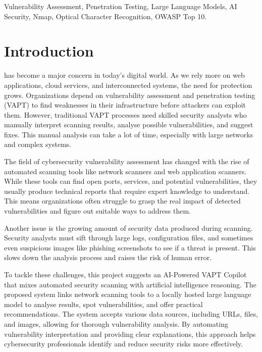 \documentclass[journal]{IEEEtran}
\begin{document}
\begin{IEEEkeywords}
Vulnerability Assessment, Penetration Testing, Large Language Models, AI Security, Nmap, Optical Character Recognition, OWASP Top 10.
\end{IEEEkeywords}


\section{Introduction}
 has become a major concern in today's digital world. As we rely more on web applications, cloud services, and interconnected systems, the need for protection grows. Organizations depend on vulnerability assessment and penetration testing (VAPT) to find weaknesses in their infrastructure before attackers can exploit them. However, traditional VAPT processes need skilled security analysts who manually interpret scanning results, analyse possible vulnerabilities, and suggest fixes. This manual analysis can take a lot of time, especially with large networks and complex systems.

The field of cybersecurity vulnerability assessment has changed with the rise of automated scanning tools like network scanners and web application scanners. While these tools can find open ports, services, and potential vulnerabilities, they usually produce technical reports that require expert knowledge to understand. This means organizations often struggle to grasp the real impact of detected vulnerabilities and figure out suitable ways to address them.

Another issue is the growing amount of security data produced during scanning. Security analysts must sift through large logs, configuration files, and sometimes even suspicious images like phishing screenshots to see if a threat is present. This slows down the analysis process and raises the risk of human error.

To tackle these challenges, this project suggests an AI-Powered VAPT Copilot that mixes automated security scanning with artificial intelligence reasoning. The proposed system links network scanning tools to a locally hosted large language model to analyse results, spot vulnerabilities, and offer practical recommendations. The system accepts various data sources, including URLs, files, and images, allowing for thorough vulnerability analysis. By automating vulnerability interpretation and providing clear explanations, this approach helps cybersecurity professionals identify and reduce security risks more effectively.
\end{document}
